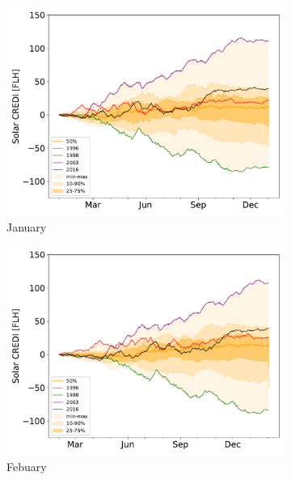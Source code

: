 \documentclass[12pt]{iopart}
\begin{document}
\begin{figure}[t]
\centering
\begin{subfigure}[t]{0.32\linewidth}
    \includegraphics[width=\linewidth]{Figures_SI/Fig_CUMSUM_YearStart_SPV_January}
    \caption{January }
\end{subfigure}
\begin{subfigure}[t]{0.32\linewidth}
    \includegraphics[width=\linewidth]{Figures_SI/Fig_CUMSUM_YearStart_SPV_February}
    \caption{Febuary }
\end{subfigure}
\begin{subfigure}[t]{0.32\linewidth}

\end{subfigure}
\end{figure}
\end{document}
